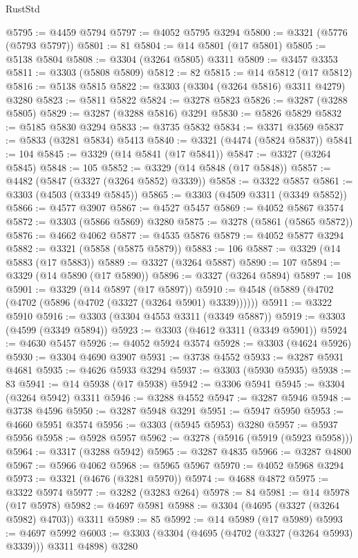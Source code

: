\begin{lexlean}{RustStd}
\begin{coremodule}
{\begin{coremodule}
{{{{{{{{{{{{{{{{{{{{{{{{{{{{{{{{{@5795 := @4459 @5794
@5797 := @4052 @5795 @3294
@5800 := @3321 (@5776 (@5793 @5797))
@5801 := 81
@5804 := @14 @5801 (@17 @5801)
@5805 := @5138 @5804
@5808 := @3304 (@3264 @5805) @3311
@5809 := @3457 @3353
@5811 := @3303 (@5808 @5809)
@5812 := 82
@5815 := @14 @5812 (@17 @5812)
@5816 := @5138 @5815
@5822 := @3303 (@3304 (@3264 @5816) @3311 @4279) @3280
@5823 := @5811 @5822
@5824 := @3278 @5823
@5826 := @3287 (@3288 @5805)
@5829 := @3287 (@3288 @5816) @3291
@5830 := @5826 @5829
@5832 := @5185 @5830 @3294
@5833 := @3735 @5832
@5834 := @3371 @3569
@5837 := @5833 (@3281 @5834) @5413
@5840 := @3321 (@4474 (@5824 @5837))
@5841 := 104
@5845 := @3329 (@14 @5841 (@17 @5841))
@5847 := @3327 (@3264 @5845)
@5848 := 105
@5852 := @3329 (@14 @5848 (@17 @5848))
@5857 := @4482 (@5847 (@3327 (@3264 @5852) @3339))
@5858 := @3322 @5857
@5861 := @3303 (@4503 (@3349 @5845))
@5865 := @3303 (@4509 @3311 (@3349 @5852))
@5866 := @4577 @3907
@5867 := @4527 @5457
@5869 := @4052 @5867 @3574
@5872 := @3303 (@5866 @5869) @3280
@5875 := @3278 (@5861 (@5865 @5872))
@5876 := @4662 @4062
@5877 := @4535 @5876
@5879 := @4052 @5877 @3294
@5882 := @3321 (@5858 (@5875 @5879))
@5883 := 106
@5887 := @3329 (@14 @5883 (@17 @5883))
@5889 := @3327 (@3264 @5887)
@5890 := 107
@5894 := @3329 (@14 @5890 (@17 @5890))
@5896 := @3327 (@3264 @5894)
@5897 := 108
@5901 := @3329 (@14 @5897 (@17 @5897))
@5910 := @4548 (@5889 (@4702 (@4702 (@5896 (@4702 (@3327 (@3264 @5901) @3339))))))
@5911 := @3322 @5910
@5916 := @3303 (@3304 @4553 @3311 (@3349 @5887))
@5919 := @3303 (@4599 (@3349 @5894))
@5923 := @3303 (@4612 @3311 (@3349 @5901))
@5924 := @4630 @5457
@5926 := @4052 @5924 @3574
@5928 := @3303 (@4624 @5926)
@5930 := @3304 @4690 @3907
@5931 := @3738 @4552
@5933 := @3287 @5931 @4681
@5935 := @4626 @5933 @3294
@5937 := @3303 (@5930 @5935)
@5938 := 83
@5941 := @14 @5938 (@17 @5938)
@5942 := @3306 @5941
@5945 := @3304 (@3264 @5942) @3311
@5946 := @3288 @4552
@5947 := @3287 @5946
@5948 := @3738 @4596
@5950 := @3287 @5948 @3291
@5951 := @5947 @5950
@5953 := @4660 @5951 @3574
@5956 := @3303 (@5945 @5953) @3280
@5957 := @5937 @5956
@5958 := @5928 @5957
@5962 := @3278 (@5916 (@5919 (@5923 @5958)))
@5964 := @3317 (@3288 @5942)
@5965 := @3287 @4835
@5966 := @3287 @4800
@5967 := @5966 @4062
@5968 := @5965 @5967
@5970 := @4052 @5968 @3294
@5973 := @3321 (@4676 (@3281 @5970))
@5974 := @4688 @4872
@5975 := @3322 @5974
@5977 := @3282 (@3283 @264)
@5978 := 84
@5981 := @14 @5978 (@17 @5978)
@5982 := @4697 @5981
@5988 := @3304 (@4695 (@3327 (@3264 @5982) @4703)) @3311
@5989 := 85
@5992 := @14 @5989 (@17 @5989)
@5993 := @4697 @5992
@6003 := @3303 (@3304 (@4695 (@4702 (@3327 (@3264 @5993) @3339))) @3311 @4898) @3280
}}}}}}}}}}}}}}}}}}}}}}}}}}}}}}}}}
\end{coremodule}}
\end{coremodule}
\end{lexlean}
